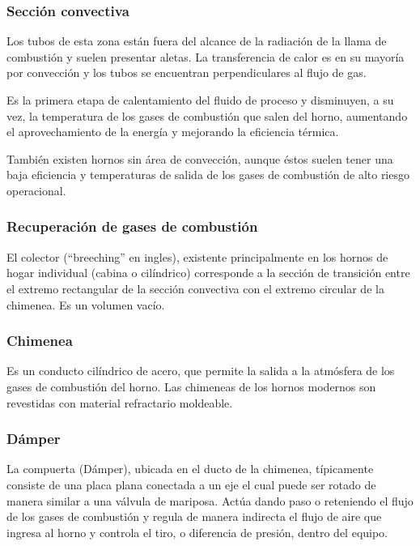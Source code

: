 \subsubsection{Sección convectiva}
\par Los tubos de esta zona están fuera del alcance de la radiación de la llama de combustión y suelen presentar aletas. La transferencia de calor es en su mayoría por convección y los tubos se encuentran perpendiculares al flujo de gas.
\par Es la primera etapa de calentamiento del fluido de proceso y disminuyen, a su vez, la temperatura de los gases de combustión que salen del horno, aumentando el aprovechamiento de la energía y mejorando la eficiencia térmica.
\par También existen hornos sin área de convección, aunque éstos suelen tener una baja eficiencia y temperaturas de salida de los gases de combustión de alto riesgo operacional.

\subsubsection{Recuperación de gases de combustión}
El colector (“breeching” en ingles), existente principalmente en los hornos de hogar individual (cabina o cilíndrico) corresponde a la sección de transición entre el extremo rectangular de la sección convectiva con el extremo circular de la chimenea. Es un volumen vacío.

\subsubsection{Chimenea}
\par Es un conducto cilíndrico de acero, que permite la salida a la atmósfera de los gases de combustión del horno. Las chimeneas de los hornos modernos son revestidas con material refractario moldeable.

\subsubsection{Dámper}
\par La compuerta (Dámper), ubicada en el ducto de la chimenea, típicamente consiste de una placa plana conectada a un eje el cual puede ser rotado de manera similar a una válvula de mariposa. Actúa dando paso o reteniendo el flujo de los gases de combustión y regula de manera indirecta el flujo de aire que ingresa al horno y controla el tiro, o diferencia de presión, dentro del equipo.

